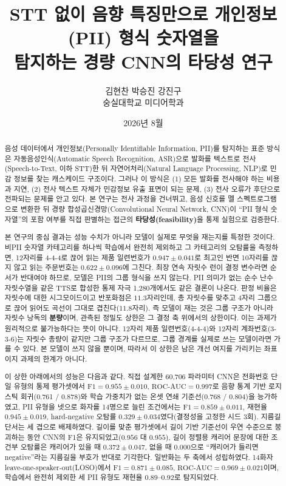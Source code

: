 \documentclass[11pt]{article}
\title{STT 없이 음향 특징만으로 개인정보(PII) 형식 숫자열을\\
탐지하는 경량 CNN의 타당성 연구}
\author{김현찬 \quad 박승진 \quad 강진구 \\[2pt]
\normalsize 숭실대학교 미디어학과}
\date{2026년 8월}
\renewcommand{\emph}[1]{\textbf{#1}}
\begin{document}
\maketitle

\begin{abstract}
음성 데이터에서 개인정보(Personally Identifiable Information, PII)를 탐지하는 표준 방식은
자동음성인식(Automatic Speech Recognition, ASR)으로 발화를 텍스트로 전사(Speech-to-Text,
이하 STT)한 뒤 자연어처리(Natural Language Processing, NLP)로 민감 정보를 찾는 캐스케이드
구조이다. 그러나 이 방식은 (1) 모든 발화를 전사해야 하는 비용과 지연, (2) 전사 텍스트
자체가 민감정보 유출 표면이 되는 문제, (3) 전사 오류가 후단으로 전파되는 문제를 안고 있다.
본 연구는 전사 과정을 건너뛰고, 음성 신호를 멜 스펙트로그램으로 변환한 뒤 경량
합성곱신경망(Convolutional Neural Network, CNN)이 ``PII 형식 숫자열''의 포함 여부를 직접
판별하는 접근의 \emph{타당성(feasibility)}을 통제 실험으로 검증한다.

본 연구의 중심 결과는 성능 수치가 아니라 모델이 실제로 무엇을 재는지를 특정한 것이다.
비PII 숫자열 카테고리를 하나씩 학습에서 완전히 제외하고 그 카테고리의 오탐률을 측정하면,
12자리를 4-4-4로 끊어 읽는 제품 일련번호가 $0.947\pm0.041$로 최고인 반면 10자리를 끊지 않고
읽는 주문번호는 $0.622\pm0.096$에 그친다. 최장 연속 자릿수 런이 결정 변수라면 순서가 반대여야
하므로, 모델은 PII의 그룹 형식을 쓰지 않는다. PII 의미가 없는 순수 난수 자릿수열을 같은 TTS로
합성한 통제 자극 1{,}280개에서도 같은 결론이 나온다. 판정 비율은 자릿수에 대한 시그모이드이고
반포화점은 $11.3$자리인데, 총 자릿수를 맞추고 4자리 그룹으로 끊어 읽어도 곡선이 그대로
겹친다($11.8$자리). 즉 모델이 재는 것은 그룹 구조가 아니라 자릿수 낭독의 \emph{분량}이며, 관측된
정밀도 상한은 그 결정 축 위에서의 상한이다. 이는 과제가 원리적으로 불가능하다는 뜻이 아니다.
12자리 제품 일련번호(4-4-4)와 12자리 계좌번호(3-3-6)는 자릿수 총량이 같지만 그룹 구조가
다르므로, 그룹 경계를 실제로 쓰는 모델이라면 가를 수 있다. 본 모델이 쓰지 않을 뿐이며,
따라서 이 상한은 남은 개선 여지를 가리키는 좌표이지 과제의 한계가 아니다.

이 상한 아래에서의 성능은 다음과 같다. 직접 설계한 60{,}706 파라미터 CNN은 전화번호 단일
유형의 통제 평가셋에서 $\text{F1}=0.955\pm0.010$, $\text{ROC-AUC}=0.997$로 음향 통계 기반
로지스틱 회귀(0.761 / 0.878)와 학습 가중치가 없는 온셋 연쇄 기준선(0.768 / 0.804)을
능가하였고, PII 유형을 넷으로 화자를 14명으로 늘린 조건에서는 $\text{F1}=0.859\pm0.011$,
재현율 $0.945\pm0.019$, hard-negative 오탐률 $0.329\pm0.034$였다(결정성을 고정한 시드 3회).
지름길 단서는 세 겹으로 배제하였다. 길이를 맞춘 평가셋에서 길이 기반 기준선이 우연 수준으로
붕괴하는 동안 CNN의 F1은 유지되었고($0.956$ 대 $0.955$), 길이 정렬용 캐리어 문장에 대한
조건부 오탐률은 캐리어가 있을 때 $0.372\pm0.047$, 없을 때 $0.000$으로 ``캐리어가 들리면
negative''라는 지름길을 부호가 반대로 기각한다. 일반화는 두 축에서 성립하였다. 14화자
leave-one-speaker-out(LOSO)에서 $\text{F1}=0.871\pm0.085$, $\text{ROC-AUC}=0.969\pm0.021$이며,
학습에서 완전히 제외한 세 PII 유형도 재현율 $0.89$--$0.92$로 탐지되었다.


\end{abstract}
\end{document}
